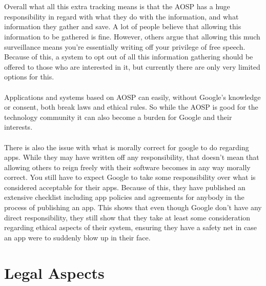 \documentclass[conference]{IEEEtran}
\begin{document}
\\\\Overall what all this extra tracking means is that the AOSP has a huge responsibility in regard with what they do with the information, and what information they gather and save. A lot of people believe that allowing this information to be gathered is fine. However, others argue that allowing this much surveillance means you're essentially writing off your privilege of free speech. Because of this, a system to opt out of all this information gathering should be offered to those who are interested in it, but currently there are only very limited options for this. 
\\\\Applications and systems based on AOSP can easily, without Google's knowledge or consent, both break laws and ethical rules. So while the AOSP is good for the technology community it can also become a burden for Google and their interests.
\\\\There is also the issue with what is morally correct for google to do regarding apps. While they may have written off any responsibility, that doesn't mean that allowing others to reign freely with their software becomes in any way morally correct. You still have to expect Google to take some responsibility over what is considered acceptable for their apps. Because of this, they have published an extensive checklist including app policies and agreements for anybody in the process of publishing an app.\cite{app-publishing} This shows that even though Google don't have any direct responsibility, they still show that they take at least some consideration regarding ethical aspects of their system, ensuring they have a safety net in case an app were to suddenly blow up in their face. 


\section{Legal Aspects}
\label{legal}
\end{document}
